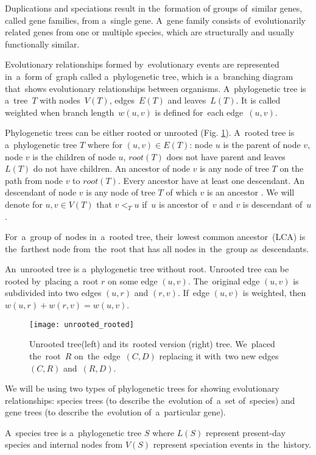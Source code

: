 Duplications and speciations result in the~formation of groups of~similar genes, called gene families, from a~single gene. A~gene family consists of~evolutionarily related genes from one or multiple species, which are structurally and usually functionally similar.

Evolutionary relationships formed by~evolutionary events are represented in~a~form of~graph called a~phylogenetic tree, which is a~branching diagram that~shows evolutionary relationships between organisms. A~phylogenetic tree is a~tree~$T$ with nodes~$V(T)$, edges~$E(T)$ and leaves~$L(T)$. It is called weighted when branch length~$w(u, v)$ is defined for~each edge~$(u, v)$.

Phylogenetic trees can be either rooted or unrooted (Fig. \ref{unrooted_rooted}). A~rooted tree is a~phylogenetic tree $T$ where for $(u, v) \in E(T)$: node $u$ is the parent of node $v$, node $v$ is the children of node $u$, $root(T)$ does not have parent and leaves $L(T)$ do not have children. An ancestor of node $v$ is any node of tree $T$ on the path from node $v$ to $root(T)$. Every ancestor have at least one descendant. An descendant of node $v$ is any node of tree $T$ of which $v$ is an ancestor \cite{hasic}. We will denote for $u, v \in V(T)$ that $v<_Tu$ if~$u$ is ancestor of~$v$ and $v$ is descendant of~$u$.

For~a~group of~nodes in~a~rooted tree, their~lowest common ancestor~(LCA) is the~farthest node from~the~root that has all nodes in~the~group as~descendants.

An~unrooted tree is a~phylogenetic tree without root. Unrooted tree can be rooted by~placing a~root $r$ on some edge $(u, v)$. The~original edge $(u, v)$ is subdivided into two edges $(u, r)$ and $(r, v)$. If~edge $(u, v)$ is weighted, then $w(u, r) + w(r, v) = w(u, v)$.

\begin{figure}[h]
	\centering
	\label{unrooted_rooted}
  	\texttt{[image: unrooted\_rooted]}
  	\caption{Unrooted tree(left) and its~rooted version (right) tree. We~placed the~root~$R$ on~the~edge~$(C, D)$ replacing it with~two new edges~$(C, R)$ and~$(R, D)$.}
\end{figure}

We will be using two types of phylogenetic trees for showing evolutionary relationships: species trees (to describe the~evolution of~a~set of~species) and gene trees (to describe the~evolution of~a~particular gene).

A~species tree is a~phylogenetic tree $S$ where $L(S)$ represent present-day species and internal nodes from $V(S)$ represent speciation events in~the~history.

